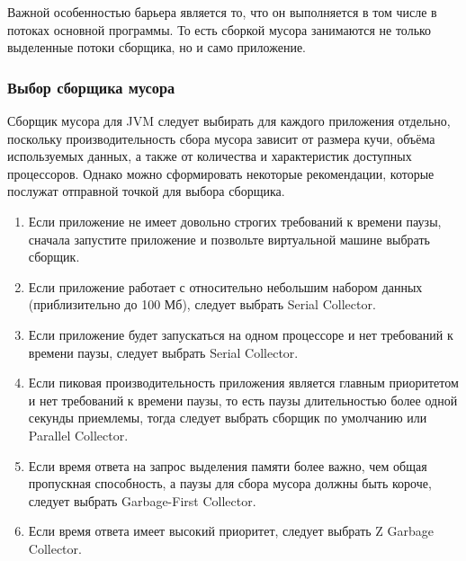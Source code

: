 Важной особенностью барьера является то, что он выполняется в том числе в потоках основной программы. То есть сборкой мусора занимаются не только выделенные потоки сборщика, но и само приложение.


\subsubsection{Выбор сборщика мусора}

Сборщик мусора для JVM следует выбирать для каждого приложения отдельно, поскольку производительность сбора мусора зависит от размера кучи, объёма используемых данных, а также от количества и характеристик доступных процессоров. Однако можно сформировать некоторые рекомендации, которые послужат отправной точкой для выбора сборщика. \cite{java_11_available_collectors}

\begin{enumerate}[label*=\arabic*.]
	\item Если приложение не имеет довольно строгих требований к времени паузы, сначала запустите приложение и позвольте виртуальной машине выбрать сборщик.
	\item Если приложение работает с относительно небольшим набором данных (приблизительно до 100 Мб), следует выбрать Serial Collector.
	\item Если приложение будет запускаться на одном процессоре и нет требований к времени паузы, следует выбрать Serial Collector.
	\item Если пиковая производительность приложения является главным приоритетом и нет требований к времени паузы, то есть паузы длительностью более одной секунды приемлемы, тогда следует выбрать сборщик по умолчанию или Parallel Collector.
	\item Если время ответа на запрос выделения памяти более важно, чем общая пропускная способность, а паузы для сбора мусора должны быть короче, следует выбрать Garbage-First Collector.
	\item Если время ответа имеет высокий приоритет, следует выбрать Z Garbage Collector.
\end{enumerate}



